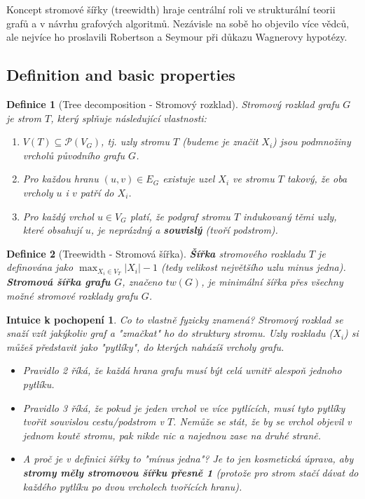 \documentclass[a4paper,11pt]{article}
\newtheorem{definition}{Definice}[section]
\newtheorem*{intuition}{Intuice k pochopení}
\begin{document}
Koncept stromové šířky (treewidth) hraje centrální roli ve strukturální teorii grafů a v návrhu grafových algoritmů. Nezávisle na sobě ho objevilo více vědců, ale nejvíce ho proslavili Robertson a Seymour při důkazu Wagnerovy hypotézy.

\subsection{Definition and basic properties}

\begin{definition}[Tree decomposition - Stromový rozklad]
Stromový rozklad grafu $G$ je strom $T$, který splňuje následující vlastnosti:
\begin{enumerate}
    \item $V(T) \subseteq \mathcal{P}(V_G)$, tj. uzly stromu $T$ (budeme je značit $X_i$) jsou podmnožiny vrcholů původního grafu $G$.
    \item Pro každou hranu $(u,v) \in E_G$ existuje uzel $X_i$ ve stromu $T$ takový, že oba vrcholy $u$ i $v$ patří do $X_i$.
    \item Pro každý vrchol $u \in V_G$ platí, že podgraf stromu $T$ indukovaný těmi uzly, které obsahují $u$, je neprázdný a \textbf{souvislý} (tvoří podstrom).
\end{enumerate}
\end{definition}

\begin{definition}[Treewidth - Stromová šířka]
\textbf{Šířka} stromového rozkladu $T$ je definována jako $\max_{X_i \in V_T} |X_i| - 1$ (tedy velikost největšího uzlu minus jedna). 
\textbf{Stromová šířka grafu $G$}, značeno $tw(G)$, je minimální šířka přes všechny možné stromové rozklady grafu $G$.
\end{definition}

\begin{intuition}
Co to vlastně fyzicky znamená? Stromový rozklad se snaží vzít jakýkoliv graf a "zmačkat" ho do struktury stromu. Uzly rozkladu ($X_i$) si můžeš představit jako "pytlíky", do kterých naházíš vrcholy grafu. 
\begin{itemize}
    \item Pravidlo 2 říká, že každá hrana grafu musí být celá uvnitř alespoň jednoho pytlíku.
    \item Pravidlo 3 říká, že pokud je jeden vrchol ve více pytlících, musí tyto pytlíky tvořit souvislou cestu/podstrom v $T$. Nemůže se stát, že by se vrchol objevil v jednom koutě stromu, pak nikde nic a najednou zase na druhé straně.
    \item A proč je v definici šířky to "mínus jedna"? Je to jen kosmetická úprava, aby \textbf{stromy měly stromovou šířku přesně 1} (protože pro strom stačí dávat do každého pytlíku po dvou vrcholech tvořících hranu).
\end{itemize}
\end{intuition}
\end{document}
